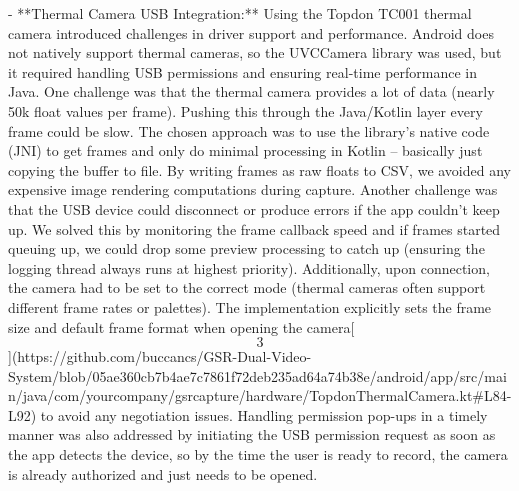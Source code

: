 \documentclass[12pt,a4paper]{article}
\begin{document}
{- **Thermal Camera USB Integration:** Using the Topdon TC001 thermal
  camera introduced challenges in driver support and performance.
  Android does not natively support thermal cameras, so the UVCCamera
  library was used, but it required handling USB permissions and
  ensuring real-time performance in Java. One challenge was that the
  thermal camera provides a lot of data (nearly 50k float values per
  frame). Pushing this through the Java/Kotlin layer every frame could
  be slow. The chosen approach was to use the library's native code
  (JNI) to get frames and only do minimal processing in Kotlin --
  basically just copying the buffer to file. By writing frames as raw
  floats to CSV, we avoided any expensive image rendering computations
  during capture. Another challenge was that the USB device could
  disconnect or produce errors if the app couldn't keep up. We solved
  this by monitoring the frame callback speed and if frames started
  queuing up, we could drop some preview processing to catch up
  (ensuring the logging thread always runs at highest priority).
  Additionally, upon connection, the camera had to be set to the correct
  mode (thermal cameras often support different frame rates or
  palettes). The implementation explicitly sets the frame size and
  default frame format when opening the
  camera[\[3\]](https://github.com/buccancs/GSR-Dual-Video-System/blob/05ae360cb7b4ae7c7861f72deb235ad64a74b38e/android/app/src/main/java/com/yourcompany/gsrcapture/hardware/TopdonThermalCamera.kt#L84-L92)
  to avoid any negotiation issues. Handling permission pop-ups in a
  timely manner was also addressed by initiating the USB permission
  request as soon as the app detects the device, so by the time the user
  is ready to record, the camera is already authorized and just needs to
  be opened.

}
\end{document}
